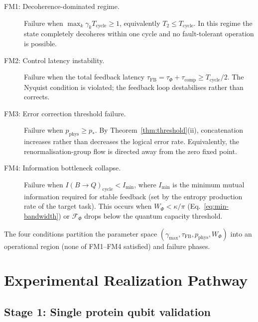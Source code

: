 \begin{description}
  \item[FM1: Decoherence-dominated regime.]
        Failure when $\max_k \gamma_k T_{\mathrm{cycle}} \geq 1$,
        equivalently $T_2 \leq T_{\mathrm{cycle}}$.  In this regime the
        state completely decoheres within one cycle and no fault-tolerant
        operation is possible.

  \item[FM2: Control latency instability.]
        Failure when the total feedback latency
        $\tau_{\mathrm{FB}} = \tau_\Phi + \tau_{\mathrm{comp}} \geq T_{\mathrm{cycle}}/2$.
        The Nyquist condition is violated; the feedback loop destabilises
        rather than corrects.

  \item[FM3: Error correction threshold failure.]
        Failure when $p_{\mathrm{phys}} \geq p_*$.  By
        Theorem~\ref{thm:threshold}(ii), concatenation increases rather
        than decreases the logical error rate.  Equivalently, the
        renormalisation-group flow is directed away from the zero
        fixed point.

  \item[FM4: Information bottleneck collapse.]
        Failure when $I(B \to Q)_{\mathrm{cycle}} < I_{\mathrm{min}}$,
        where $I_{\mathrm{min}}$ is the minimum mutual information
        required for stable feedback (set by the entropy production rate
        of the target task).  This occurs when
        $W_\Phi < \kappa/\pi$ (Eq.~\eqref{eq:min-bandwidth}) or
        $\mathcal{F}_\Phi$ drops below the quantum capacity threshold.
\end{description}

\noindent
The four conditions partition the parameter space
$(\gamma_{\max}, \tau_{\mathrm{FB}}, p_{\mathrm{phys}}, W_\Phi)$
into an operational region (none of FM1--FM4 satisfied) and failure
phases.

\section{Experimental Realization Pathway}
\label{sec:ch21-experiment}

\subsection{Stage 1: Single protein qubit validation}

